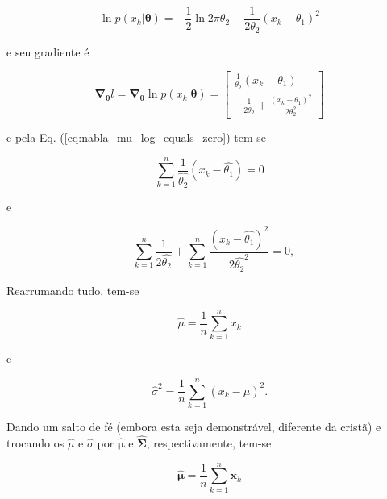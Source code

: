 \documentclass[a4paper,12pt,twocolumn]{article}
\newcommand{\equationref}[1]{Eq. (\ref{eq:#1})}
\newcommand{\tworowsmatrix}[2]
{
    \begin{bmatrix}
            #1\\
            #2
    \end{bmatrix}
}
\begin{document}
\begin{equation}
    \ln p(x_k|\boldsymbol{\theta}) = -\frac{1}{2} \ln 2\pi\theta_2 - \frac{1}{2\theta_2}(x_k - \theta_1)^2
    \label{eq:log_likelihood_mu_sigma_univar}
\end{equation}

\noindent e seu gradiente é

\begin{equation}
    \boldsymbol{\nabla}_{\boldsymbol{\theta}} l = \boldsymbol{\nabla}_{\boldsymbol{\theta}} \ln p(x_k|\boldsymbol{\theta}) = \tworowsmatrix{\frac{1}{\theta_2}(x_k - \theta_1)}{-\frac{1}{2\theta_2} + \frac{(x_k - \theta_1)^2}{2\theta_2^2}}
    \label{eq:grad_log_likelihood_mu_sigma_univar}
\end{equation}

\noindent e pela \equationref{nabla_mu_log_equals_zero} tem-se

\begin{equation}
    \sum_{k=1}^n \frac{1}{\hat{\theta_2}}(x_k - \hat{\theta_1}) = 0
    \label{eq:grad_log_likelihood_mu_sigma_univar_theta_1}
\end{equation}

\noindent e

\begin{equation}
    -\sum_{k=1}^n \frac{1}{2\hat{\theta_2}} + \sum_{k=1}^n \frac{(x_k - \hat{\theta_1})^2}{2\hat{\theta_2}^2} = 0,
    \label{eq:grad_log_likelihood_mu_sigma_univar_theta_2}
\end{equation}

\noindent Rearrumando tudo, tem-se

\begin{equation}
    \hat{\mu} = \frac{1}{n} \sum_{k=1}^n x_k
    \label{eq:mu_optimum_case_2}
\end{equation}

\noindent e

\begin{equation}
    \hat{\sigma}^2 = \frac{1}{n} \sum_{k=1}^n (x_k - \hat{\mu})^2.
    \label{eq:sigma_optimum_case_2}
\end{equation}

Dando um salto de fé (embora esta seja demonstrável, diferente da cristã) e trocando os $\hat{\mu}$ e $\hat{\sigma}$ por $\boldsymbol{\hat{\mu}}$ e $\boldsymbol{\hat{\Sigma}}$, respectivamente, tem-se

\begin{equation}
    \boldsymbol{\hat{\mu}} = \frac{1}{n} \sum_{k=1}^n \boldsymbol{x}_k
    \label{eq:bold_mu_optimum_case_2}
\end{equation}
\end{document}
